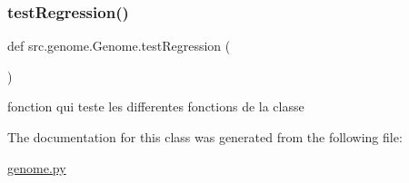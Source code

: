 \subsubsection{\texorpdfstring{test\+Regression()}{testRegression()}}
{\footnotesize\ttfamily def src.\+genome.\+Genome.\+test\+Regression (\begin{DoxyParamCaption}{ }\end{DoxyParamCaption})\hspace{0.3cm}{\ttfamily [static]}}



fonction qui teste les differentes fonctions de la classe 



The documentation for this class was generated from the following file\+:\begin{DoxyCompactItemize}
\item 
\hyperlink{genome_8py}{genome.\+py}\end{DoxyCompactItemize}

